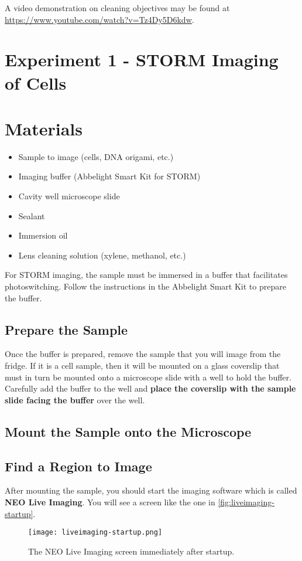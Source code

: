 \documentclass[10pt,a4paper,oneside]{book}
\begin{document}
A video demonstration on cleaning objectives may be found at \url{https://www.youtube.com/watch?v=Tz4Dy5D6kdw}.

\section{Experiment 1 - STORM Imaging of Cells}

\section{Materials}

\begin{itemize}
    \item{Sample to image (cells, DNA origami, etc.)}
    \item{Imaging buffer (Abbelight Smart Kit for STORM)}
    \item{Cavity well microscope slide}
    \item{Sealant}
    \item{Immersion oil}
    \item{Lens cleaning solution (xylene, methanol, etc.)}
\end{itemize}


For STORM imaging, the sample must be immersed in a buffer that facilitates photoswitching. Follow the instructions in the Abbelight Smart Kit to prepare the buffer.

\subsection{Prepare the Sample}

Once the buffer is prepared, remove the sample that you will image from the fridge. If it is a cell sample, then it will be mounted on a glass coverslip that must in turn be mounted onto a microscope slide with a well to hold the buffer. Carefully add the buffer to the well and \textbf{place the coverslip with the sample slide facing the buffer} over the well.

\subsection{Mount the Sample onto the Microscope}

\subsection{Find a Region to Image}

After mounting the sample, you should start the imaging software which is called \textbf{NEO Live Imaging}. You will see a screen like the one in \autoref{fig:liveimaging-startup}.

\begin{figure}[ht]
    \centering
    \texttt{[image: liveimaging-startup.png]}
    \caption{The NEO Live Imaging screen immediately after startup.}
    \label{fig:liveimaging-startup}
\end{figure}
\end{document}
